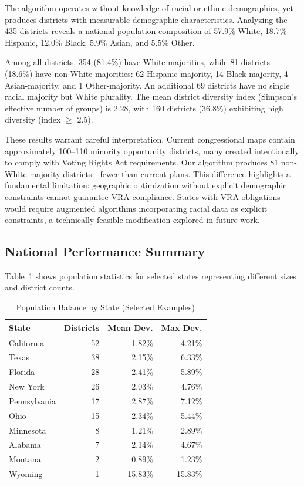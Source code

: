 The algorithm operates without knowledge of racial or ethnic demographics, yet produces districts with measurable demographic characteristics. Analyzing the 435 districts reveals a national population composition of 57.9\% White, 18.7\% Hispanic, 12.0\% Black, 5.9\% Asian, and 5.5\% Other.

Among all districts, 354 (81.4\%) have White majorities, while 81 districts (18.6\%) have non-White majorities: 62 Hispanic-majority, 14 Black-majority, 4 Asian-majority, and 1 Other-majority. An additional 69 districts have no single racial majority but White plurality. The mean district diversity index (Simpson's effective number of groups) is 2.28, with 160 districts (36.8\%) exhibiting high diversity (index $\geq$ 2.5).

These results warrant careful interpretation. Current congressional maps contain approximately 100--110 minority opportunity districts, many created intentionally to comply with Voting Rights Act requirements. Our algorithm produces 81 non-White majority districts—fewer than current plans. This difference highlights a fundamental limitation: geographic optimization without explicit demographic constraints cannot guarantee VRA compliance. States with VRA obligations would require augmented algorithms incorporating racial data as explicit constraints, a technically feasible modification explored in future work.
\subsection{National Performance Summary}
Table~\ref{tab:state_summary} shows population statistics for selected states representing different sizes and district counts.

\begin{table}[h]
\centering
\caption{Population Balance by State (Selected Examples)}
\label{tab:state_summary}
\small
\begin{tabular}{lrrr}
\toprule
\textbf{State} & \textbf{Districts} & \textbf{Mean Dev.} & \textbf{Max Dev.} \\
\midrule
California & 52 & 1.82\% & 4.21\% \\
Texas & 38 & 2.15\% & 6.33\% \\
Florida & 28 & 2.41\% & 5.89\% \\
New York & 26 & 2.03\% & 4.76\% \\
Pennsylvania & 17 & 2.87\% & 7.12\% \\
Ohio & 15 & 2.34\% & 5.44\% \\
Minnesota & 8 & 1.21\% & 2.89\% \\
Alabama & 7 & 2.14\% & 4.67\% \\
Montana & 2 & 0.89\% & 1.23\% \\
Wyoming & 1 & 15.83\% & 15.83\% \\
\bottomrule
\end{tabular}
\end{table}

